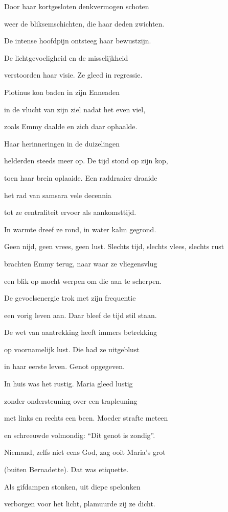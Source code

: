 Door haar kortgesloten
denkvermogen schoten

weer de bliksemschichten,
die haar deden zwichten.

De intense hoofdpijn
ontsteeg haar bewustzijn.

De lichtgevoeligheid
en de misselijkheid

verstoorden haar visie.
Ze gleed in regressie.

Plotinus kon baden
in zijn Enneaden

in de vlucht van zijn ziel
nadat het even viel,

zoals Emmy daalde
en zich daar ophaalde.

Haar herinneringen
in de duizelingen

helderden steeds meer op.
De tijd stond op zijn kop,

toen haar brein oplaaide.
Een raddraaier draaide

het rad van samsara
vele decennia

tot ze centraliteit
ervoer als aankomsttijd.

In warmte dreef ze rond,
in water kalm gegrond.

Geen nijd, geen vrees, geen lust.
Slechts tijd, slechts vlees, slechts rust

brachten Emmy terug,
naar waar ze vliegensvlug

een blik op mocht werpen
om die aan te scherpen.

De gevoelsenergie
trok met zijn frequentie

een vorig leven aan.
Daar bleef de tijd stil staan.

De wet van aantrekking
heeft immers betrekking

op voornamelijk lust.
Die had ze uitgeblust

in haar eerste leven.
Genot opgegeven.

In huis was het rustig.
Maria gleed lustig

zonder ondersteuning
over een trapleuning

met links en rechts een been.
Moeder strafte meteen

en schreeuwde volmondig:
“Dit genot is zondig”.

Niemand, zelfs niet eens God,
zag ooit Maria’s grot

(buiten Bernadette).
Dat was etiquette.

Als gifdampen stonken,
uit diepe spelonken

verborgen voor het licht,
plamuurde zij ze dicht.

